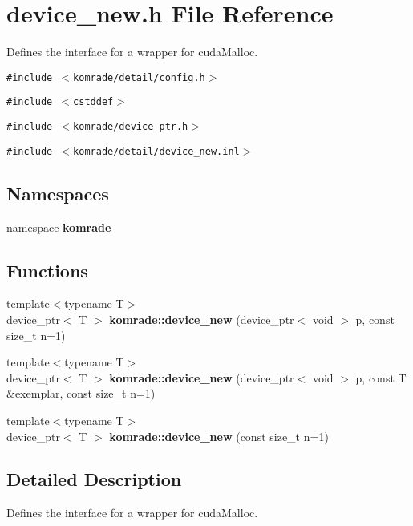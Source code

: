 \section{device\_\-new.h File Reference}
\label{device__new_8h}
Defines the interface for a wrapper for cudaMalloc. 

{\tt \#include $<$komrade/detail/config.h$>$}\par
{\tt \#include $<$cstddef$>$}\par
{\tt \#include $<$komrade/device\_\-ptr.h$>$}\par
{\tt \#include $<$komrade/detail/device\_\-new.inl$>$}\par
\subsection*{Namespaces}
\begin{CompactItemize}
\item 
namespace {\bf komrade}
\end{CompactItemize}
\subsection*{Functions}
\begin{CompactItemize}
\item 
{\footnotesize template$<$typename T$>$ }\\device\_\-ptr$<$ T $>$ {\bf komrade::device\_\-new} (device\_\-ptr$<$ void $>$ p, const size\_\-t n=1)
\item 
{\footnotesize template$<$typename T$>$ }\\device\_\-ptr$<$ T $>$ {\bf komrade::device\_\-new} (device\_\-ptr$<$ void $>$ p, const T \&exemplar, const size\_\-t n=1)
\item 
{\footnotesize template$<$typename T$>$ }\\device\_\-ptr$<$ T $>$ {\bf komrade::device\_\-new} (const size\_\-t n=1)
\end{CompactItemize}


\subsection{Detailed Description}
Defines the interface for a wrapper for cudaMalloc. 

